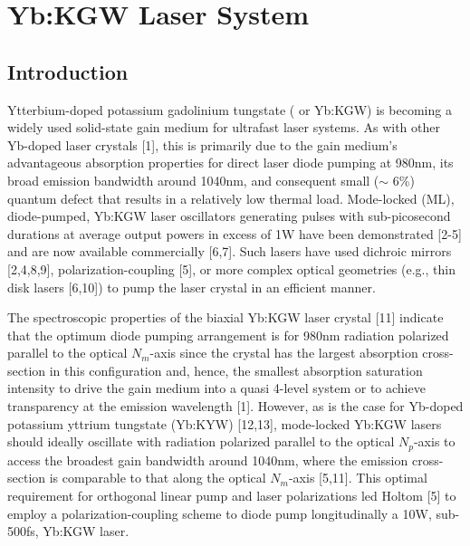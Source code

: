 
\section{Yb:KGW Laser System}
\subsection{Introduction}

Ytterbium-doped potassium gadolinium tungstate ( or Yb:KGW) is becoming a widely used solid-state gain medium for ultrafast laser systems.
As with other Yb-doped laser crystals [1], this is primarily due to the gain medium’s advantageous absorption properties for direct laser diode pumping at 980nm, its broad emission bandwidth around 1040nm, and consequent small ($\sim$ 6\%) quantum defect that results in a relatively low thermal load. 
Mode-locked (ML), diode-pumped, Yb:KGW laser oscillators generating pulses with sub-picosecond durations at average output powers in excess of 1W have been demonstrated [2-5] and are now available commercially [6,7].
Such lasers have used dichroic mirrors [2,4,8,9], polarization-coupling [5], or more complex optical geometries (e.g., thin disk lasers [6,10]) to pump the laser crystal in an efficient manner.

The spectroscopic properties of the biaxial Yb:KGW laser crystal [11] indicate that the optimum diode pumping arrangement is for 980nm radiation polarized parallel to the optical $N_m$-axis since the crystal has the largest absorption cross-section in this configuration and, hence, the smallest absorption saturation intensity to drive the gain medium into a quasi 4-level system or to achieve transparency at the emission wavelength [1].
However, as is the case for Yb-doped potassium yttrium tungstate (Yb:KYW) [12,13], mode-locked Yb:KGW lasers should ideally oscillate with radiation polarized parallel to the optical $N_p$-axis to access the broadest gain bandwidth around 1040nm, where the emission cross-section is comparable to that along the optical $N_m$-axis [5,11]. This optimal requirement for orthogonal linear pump and laser polarizations led Holtom [5] to employ a polarization-coupling scheme to diode pump longitudinally a 10W, sub-500fs, Yb:KGW laser.

